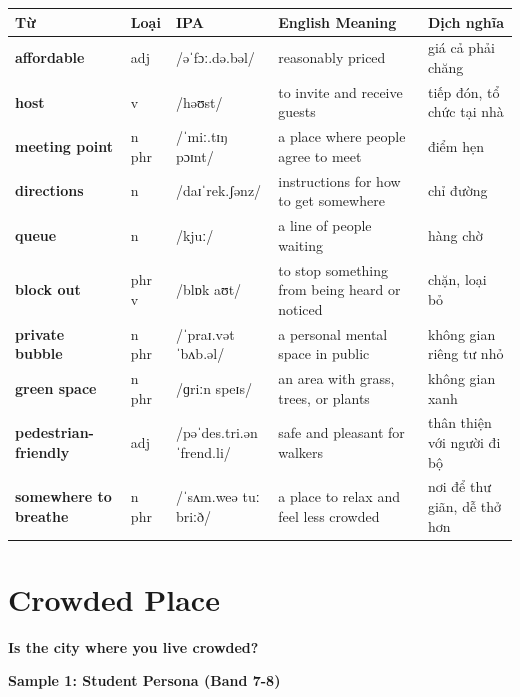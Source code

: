 \vspace{0.8em}
\begin{center}
\renewcommand{\arraystretch}{1.65}
\begin{tabularx}{\textwidth}{|V{0.22\textwidth}|C{0.07\textwidth}|I{0.20\textwidth}|Y|V{0.18\textwidth}|}
\hline
{}
\textbf{Từ} & \textbf{Loại} & \textbf{IPA} & \textbf{English Meaning} & \textbf{Dịch nghĩa} \\
\hline
\textbf{affordable} & adj & /əˈfɔː.də.bəl/ & reasonably priced & giá cả phải chăng \\ \hline
\textbf{host} & v & /həʊst/ & to invite and receive guests & tiếp đón, tổ chức tại nhà \\ \hline
\textbf{meeting point} & n phr & /ˈmiː.tɪŋ pɔɪnt/ & a place where people agree to meet & điểm hẹn \\ \hline
\textbf{directions} & n & /daɪˈrek.ʃənz/ & instructions for how to get somewhere & chỉ đường \\ \hline
\textbf{queue} & n & /kjuː/ & a line of people waiting & hàng chờ \\ \hline
\textbf{block out} & phr v & /blɒk aʊt/ & to stop something from being heard or noticed & chặn, loại bỏ \\ \hline
\textbf{private bubble} & n phr & /ˈpraɪ.vət ˈbʌb.əl/ & a personal mental space in public & không gian riêng tư nhỏ \\ \hline
\textbf{green space} & n phr & /ɡriːn speɪs/ & an area with grass, trees, or plants & không gian xanh \\ \hline
\textbf{pedestrian-friendly} & adj & /pəˈdes.tri.ən ˈfrend.li/ & safe and pleasant for walkers & thân thiện với người đi bộ \\ \hline
\textbf{somewhere to breathe} & n phr & /ˈsʌm.weə tuː briːð/ & a place to relax and feel less crowded & nơi để thư giãn, dễ thở hơn \\ \hline
\end{tabularx}
\end{center}

\newpage

\section{Crowded Place}
\begin{ieltsquestion}
\textbf{Is the city where you live crowded?}
\end{ieltsquestion}
\textbf{Sample 1: Student Persona (Band 7-8)}

